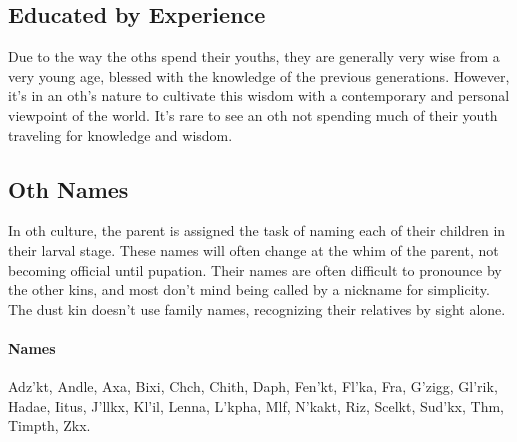 \subsection*{Educated by Experience}
    Due to the way the oths spend their youths, they are generally very wise from a very young age, blessed with the knowledge of the previous generations.
    However, it's in an oth's nature to cultivate this wisdom with a contemporary and personal viewpoint of the world.
    It's rare to see an oth not spending much of their youth traveling for knowledge and wisdom.

\subsection*{Oth Names}
    In oth culture, the parent is assigned the task of naming each of their children in their larval stage.
    These names will often change at the whim of the parent, not becoming official until pupation.
    Their names are often difficult to pronounce by the other kins, and most don't mind being called by a nickname for simplicity.
    The dust kin doesn't use family names, recognizing their relatives by sight alone.

    \paragraph{Names}
    Adz'kt, Andle, Axa, Bixi, Chch, Chith, Daph, Fen'kt, Fl'ka, Fra, G'zigg, Gl'rik, Hadae, Iitus, J'llkx, Kl'il, Lenna, L'kpha, Mlf, N'kakt, Riz, Scelkt, Sud'kx, Thm, Timpth, Zkx.


